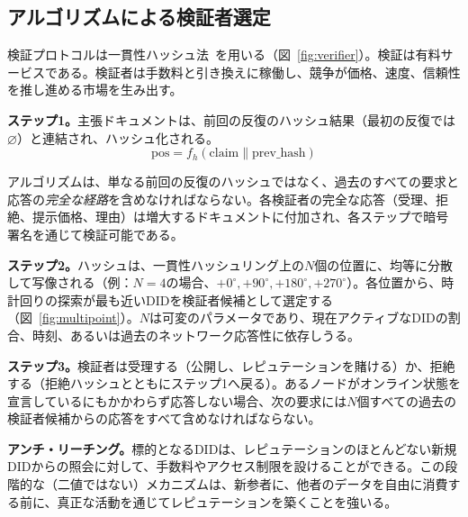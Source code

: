 \documentclass[11pt,a4paper,twocolumn]{article}
\begin{document}
\subsection{アルゴリズムによる検証者選定}

検証プロトコルは一貫性ハッシュ法~\cite{karger1997}を用いる（図~\ref{fig:verifier}）。検証は有料サービスである。検証者は手数料と引き換えに稼働し、競争が価格、速度、信頼性を推し進める市場を生み出す。

\textbf{ステップ1。}主張ドキュメントは、前回の反復のハッシュ結果（最初の反復では$\varnothing$）と連結され、ハッシュ化される。
\begin{equation}
\text{pos} = f_h(\text{claim} \| \text{prev\_hash})
\label{eq:hash}
\end{equation}

アルゴリズムは、単なる前回の反復のハッシュではなく、過去のすべての要求と応答の\emph{完全な経路}を含めなければならない。各検証者の完全な応答（受理、拒絶、提示価格、理由）は増大するドキュメントに付加され、各ステップで暗号署名を通じて検証可能である。

\textbf{ステップ2。}ハッシュは、一貫性ハッシュリング上の$N$個の位置に、均等に分散して写像される（例：$N=4$の場合、$+0^{\circ}, +90^{\circ}, +180^{\circ}, +270^{\circ}$）。各位置から、時計回りの探索が最も近いDIDを検証者候補として選定する（図~\ref{fig:multipoint}）。$N$は可変のパラメータであり、現在アクティブなDIDの割合、時刻、あるいは過去のネットワーク応答性に依存しうる。

\textbf{ステップ3。}検証者は受理する（公開し、レピュテーションを賭ける）か、拒絶する（拒絶ハッシュとともにステップ1へ戻る）。あるノードがオンライン状態を宣言しているにもかかわらず応答しない場合、次の要求には$N$個すべての過去の検証者候補からの応答をすべて含めなければならない。

\textbf{アンチ・リーチング。}標的となるDIDは、レピュテーションのほとんどない新規DIDからの照会に対して、手数料やアクセス制限を設けることができる。この段階的な（二値ではない）メカニズムは、新参者に、他者のデータを自由に消費する前に、真正な活動を通じてレピュテーションを築くことを強いる。
\end{document}
